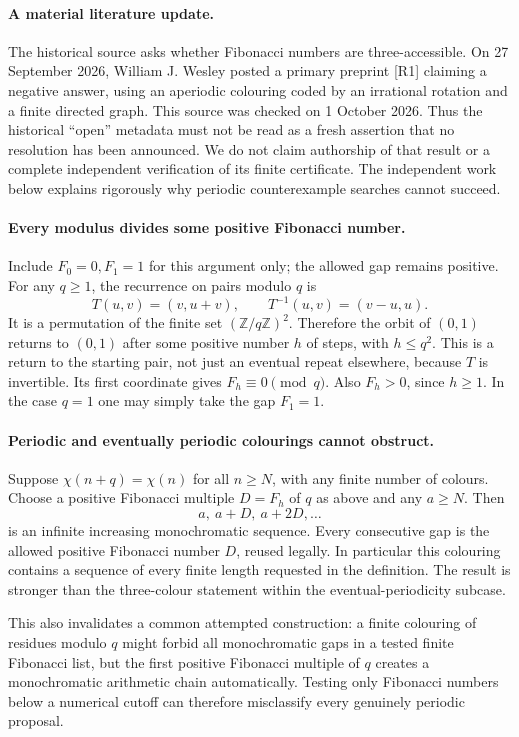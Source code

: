 \documentclass[11pt,a4paper]{article}
\begin{document}
\paragraph{A material literature update.}
The historical source asks whether Fibonacci numbers are three-accessible.
On 27 September 2026, William J. Wesley posted a primary preprint [R1]
claiming a negative answer, using an aperiodic colouring coded by an
irrational rotation and a finite directed graph. This source was checked
on 1 October 2026. Thus the historical ``open'' metadata must not be
read as a fresh assertion that no resolution has been announced.
We do not claim authorship of that result or a complete independent
verification of its finite certificate. The independent work below
explains rigorously why periodic counterexample searches cannot succeed.

\paragraph{Every modulus divides some positive Fibonacci number.}
Include $F_0=0,F_1=1$ for this argument only; the allowed gap remains
positive. For any $q\ge1$, the recurrence on pairs modulo $q$ is
\[
 T(u,v)=(v,u+v),\qquad T^{-1}(u,v)=(v-u,u).
\]
It is a permutation of the finite set $(\mathbb Z/q\mathbb Z)^2$.
Therefore the orbit of $(0,1)$ returns to $(0,1)$ after some
positive number $h$ of steps, with $h\le q^2$. This is a return
to the starting pair, not just an eventual repeat elsewhere, because
$T$ is invertible. Its first coordinate gives $F_h\equiv0\pmod q$.
Also $F_h>0$, since $h\ge1$. In the case $q=1$ one may simply
take the gap $F_1=1$.

\paragraph{Periodic and eventually periodic colourings cannot obstruct.}
Suppose $\chi(n+q)=\chi(n)$ for all $n\ge N$, with any finite
number of colours. Choose a positive Fibonacci multiple $D=F_h$
of $q$ as above and any $a\ge N$. Then
\[
 a,\ a+D,\ a+2D,\ldots
\]
is an infinite increasing monochromatic sequence. Every consecutive
gap is the allowed positive Fibonacci number $D$, reused legally.
In particular this colouring contains a sequence of every finite
length requested in the definition. The result is stronger than the
three-colour statement within the eventual-periodicity subcase.

This also invalidates a common attempted construction: a finite
colouring of residues modulo $q$ might forbid all monochromatic gaps
in a tested finite Fibonacci list, but the first positive Fibonacci
multiple of $q$ creates a monochromatic arithmetic chain automatically.
Testing only Fibonacci numbers below a numerical cutoff can therefore
misclassify every genuinely periodic proposal.
\end{document}
